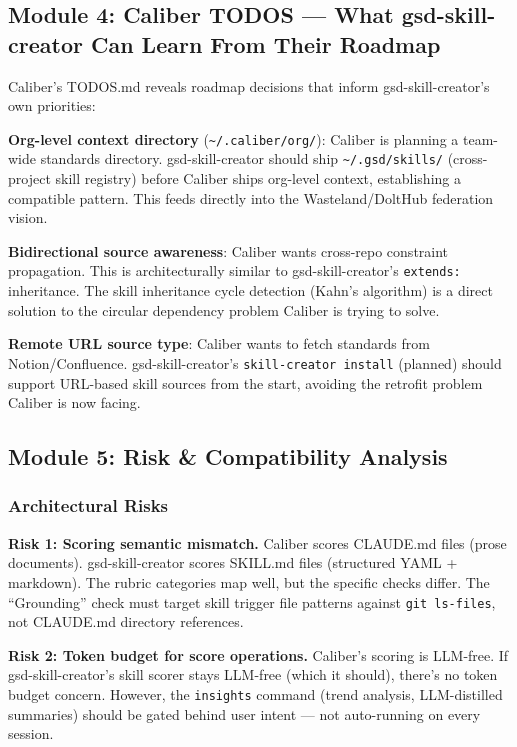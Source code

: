 \documentclass[11pt,letterpaper]{article}
\begin{document}
\subsection{Module 4: Caliber TODOS — What gsd-skill-creator Can Learn From Their Roadmap}

Caliber's TODOS.md reveals roadmap decisions that inform gsd-skill-creator's own priorities:

\textbf{Org-level context directory} (\texttt{\textasciitilde{}/.caliber/org/}): Caliber is planning a team-wide standards directory. gsd-skill-creator should ship \texttt{\textasciitilde{}/.gsd/skills/} (cross-project skill registry) before Caliber ships org-level context, establishing a compatible pattern. This feeds directly into the Wasteland/DoltHub federation vision.

\textbf{Bidirectional source awareness}: Caliber wants cross-repo constraint propagation. This is architecturally similar to gsd-skill-creator's \texttt{extends:} inheritance. The skill inheritance cycle detection (Kahn's algorithm) is a direct solution to the circular dependency problem Caliber is trying to solve.

\textbf{Remote URL source type}: Caliber wants to fetch standards from Notion/Confluence. gsd-skill-creator's \texttt{skill-creator install} (planned) should support URL-based skill sources from the start, avoiding the retrofit problem Caliber is now facing.

\subsection{Module 5: Risk \& Compatibility Analysis}

\subsubsection{Architectural Risks}

\textbf{Risk 1: Scoring semantic mismatch.} Caliber scores CLAUDE.md files (prose documents). gsd-skill-creator scores SKILL.md files (structured YAML + markdown). The rubric categories map well, but the specific checks differ. The ``Grounding'' check must target skill trigger file patterns against \texttt{git ls-files}, not CLAUDE.md directory references.

\textbf{Risk 2: Token budget for score operations.} Caliber's scoring is LLM-free. If gsd-skill-creator's skill scorer stays LLM-free (which it should), there's no token budget concern. However, the \texttt{insights} command (trend analysis, LLM-distilled summaries) should be gated behind user intent — not auto-running on every session.
\end{document}

